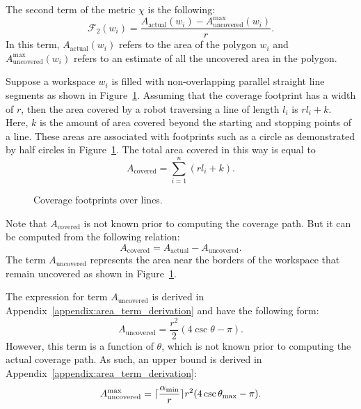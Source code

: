 \documentclass[../main.tex]{subfiles}
\begin{document}
The second term of the metric $\chi$ is the following:
\begin{equation}
	\mathcal{F}_2(w_i)=\frac{A_{\text{actual}}(w_i)-A_{\text{uncovered}}^{\max}(w_i)}{r}.
\end{equation}
In this term, $A_{\text{actual}}(w_i)$ refers to the area of the polygon $w_i$ and $A_{\text{uncovered}}^{\max}(w_i)$ refers to an estimate of all the uncovered area in the polygon.

Suppose a workspace $w_i$ is filled with non-overlapping parallel straight line segments as shown in Figure~\ref{fig:line_footprint}. Assuming that the coverage footprint has a width of $r$, then the area covered by a robot traversing a line of length $l_i$ is $rl_i+k$. Here, $k$ is the amount of area covered beyond the starting and stopping points of a line. These areas are associated with footprints such as a circle as demonstrated by half circles in Figure~\ref{fig:line_footprint}. The total area covered in this way is equal to
\begin{equation}
	\label{eq:covered_area}
	A_{\text{covered}} = \sum_{i=1}^n(rl_i+k).
\end{equation}

\begin{figure}
	\centering
	
	\caption{Coverage footprints over lines.}
	\label{fig:line_footprint}
\end{figure}

Note that $A_{\text{covered}}$ is not known prior to computing the coverage path. But it can be computed from the following relation: 
\begin{equation}
	A_{\text{covered}}=A_{\text{actual}}-A_{\text{uncovered}}.
\end{equation}
The term $A_{\text{uncovered}}$ represents the area near the borders of the workspace that remain uncovered as shown in Figure~\ref{fig:line_footprint}. 

The expression for term $A_{\text{uncovered}}$ is derived in Appendix~\ref{appendix:area_term_derivation} and have the following form:
\begin{equation}
	A_{\text{uncovered}}=\frac{r^2}{2}(4\csc\theta-\pi).
\end{equation}
However, this term is a function of $\theta$, which is not known prior to computing the actual coverage path. As such, an upper bound is derived in Appendix~\ref{appendix:area_term_derivation}:
\begin{equation}
	A_{\text{uncovered}}^{\max}=\lceil\frac{\alpha_{\min}}{r}\rceil r^2(4\csc\theta_{\max}-\pi).
\end{equation}
\end{document}
